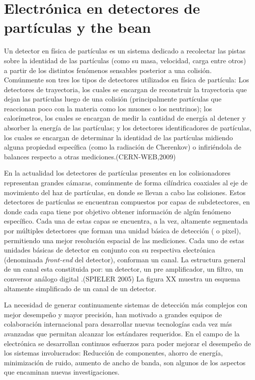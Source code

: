 \section{Electrónica en detectores de partículas y the bean}

 Un detector en física de partículas es un sistema dedicado a recolectar las pistas sobre la identidad de las partículas (como su masa, velocidad, carga entre otros) a partir de los distintos fenómenos sensables posterior a una colisión. Comúnmente son tres  los tipos de detectores utilizados en física de partícula: Los detectores de trayectoria, los cuales se encargan de reconstruir la trayectoria que dejan las partículas luego de una colisión (principalmente partículas que reaccionan poco con la materia como los muones o los neutrinos); los calorímetros, los cuales se encargan de medir la cantidad de energía al detener y absorber la energía de las partículas; y los detectores identificadores de partículas, los cuales se encargan de determinar la identidad de las partículas midiendo alguna propiedad específica (como la radiación de Cherenkov) o infiriéndola de balances respecto a otras mediciones.(CERN-WEB,2009)

En la actualidad los detectores de partículas presentes en los colisionadores representan  grandes cámaras, comúnmente de forma cilíndrica coaxiales al eje de movimiento del haz de partículas, en donde se llevan a cabo las colisiones. Estos detectores de partículas se encuentran compuestos por capas de subdetectores, en donde cada capa tiene por objetivo obtener información de algún fenómeno específico. Cada una de estas capas se encuentra, a la vez, altamente segmentada por múltiples detectores que forman una unidad básica de detección ( o pixel), permitiendo una mejor resolución espacial de las mediciones. Cada uno de estas unidades básicas de detector en conjunto con su respectiva electrónica (denominada \textit{front-end} del detector), conforman un canal. La estructura general de un canal esta constituida por: un detector, un pre amplificador, un filtro, un conversor análogo digital .(SPIELER 2005) La figura XX muestra un esquema altamente simplificado de un canal de un detector.

La necesidad de generar continuamente sistemas de detección más complejos con mejor desempeño y mayor precisión, han motivado a grandes equipos de colaboración internacional para desarrollar nuevas tecnologías cada vez más avanzadas que permitan alcanzar los estándares requeridos. En el campo de la electrónica se desarrollan continuos esfuerzos para poder mejorar el desempeño de los sistemas involucrados: Reducción de componentes, ahorro de energía, minimización de ruido, aumento de ancho de banda, son algunos de los aspectos que encaminan nuevas investigaciones.


